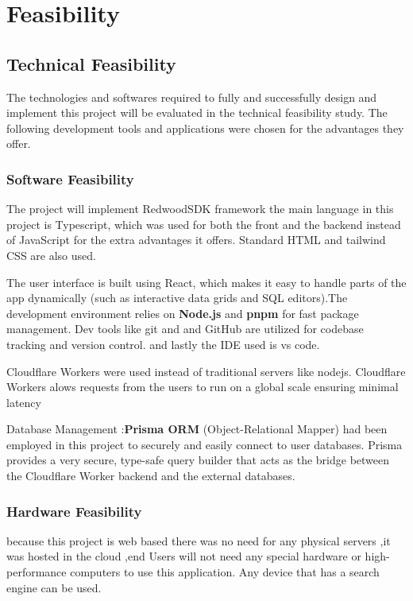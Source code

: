 \section{Feasibility}

\subsection{Technical Feasibility}


The technologies and softwares required to fully and successfully design and implement this project will be evaluated in the technical feasibility study. The following development tools and applications were chosen for the advantages they offer.
\subsubsection{Software Feasibility}
    The project will implement RedwoodSDK framework the main language in this project is Typescript, which was used for both the front and the backend instead of JavaScript for the extra advantages it offers. Standard HTML and tailwind CSS are also used.

    The user interface is built using React, which makes it easy to handle parts of the app dynamically (such as interactive data grids and SQL editors).The development environment relies on \textbf{Node.js} and \textbf{pnpm} for fast package management. Dev tools like git and and GitHub are utilized for codebase tracking and version control. and lastly the IDE used is vs code.

     Cloudflare Workers were used instead of traditional servers like nodejs. Cloudflare Workers alows requests from the users to run on a global scale ensuring minimal latency

    Database Management :\textbf{Prisma ORM} (Object-Relational Mapper) had been employed in this project to securely and easily connect to user databases. Prisma provides a very secure, type-safe query builder that acts as the bridge between the Cloudflare Worker backend and the external databases.

    


\subsubsection{Hardware Feasibility}


because this project is web based there was no need for any physical servers ,it was hosted in the cloud ,end Users will not need any special hardware or high-performance computers to use this application. Any device that has a search engine can be used.

